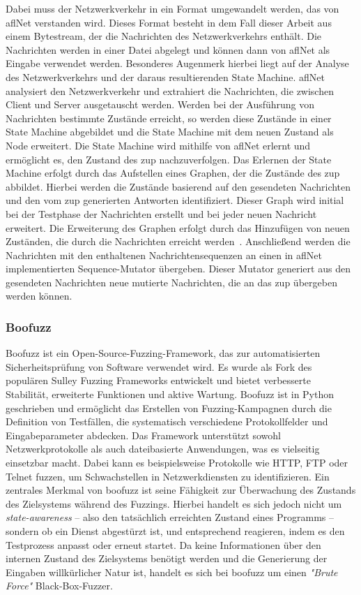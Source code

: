 Dabei muss der Netzwerkverkehr in ein Format umgewandelt werden, das von \gls{afl}Net verstanden wird.
Dieses Format besteht in dem Fall dieser Arbeit aus einem Bytestream, der die Nachrichten des Netzwerkverkehrs enthält.
Die Nachrichten werden in einer Datei abgelegt und können dann von \gls{afl}Net als Eingabe verwendet werden.
Besonderes Augenmerk hierbei liegt auf der Analyse des Netzwerkverkehrs und der daraus resultierenden State Machine.
\gls{afl}Net analysiert den Netzwerkverkehr und extrahiert die Nachrichten, die zwischen Client und Server ausgetauscht werden.
Werden bei der Ausführung von Nachrichten bestimmte Zustände erreicht, so werden diese Zustände in einer State Machine
abgebildet und die State Machine mit dem neuen Zustand als Node erweitert.
Die State Machine wird mithilfe von \gls{afl}Net erlernt und ermöglicht es, den Zustand des \gls{zup} nachzuverfolgen.
Das Erlernen der State Machine erfolgt durch das Aufstellen eines Graphen, der die Zustände des \gls{zup} abbildet.
Hierbei werden die Zustände basierend auf den gesendeten Nachrichten und den vom \gls{zup} generierten Antworten identifiziert.
Dieser Graph wird initial bei der Testphase der Nachrichten erstellt und bei jeder neuen Nachricht erweitert.
Die Erweiterung des Graphen erfolgt durch das Hinzufügen von neuen Zuständen, die durch die Nachrichten erreicht werden~\cite{AFLNet}.
\newline
Anschließend werden die Nachrichten mit den enthaltenen Nachrichtensequenzen an einen in \gls{afl}Net implementierten
Sequence-Mutator übergeben.
Dieser Mutator generiert aus den gesendeten Nachrichten neue mutierte Nachrichten, die an das \gls{zup} übergeben werden
können.
\subsubsection{Boofuzz}\label{subsubsec:boofuzz}
Boofuzz ist ein Open-Source-Fuzzing-Framework, das zur automatisierten Sicherheitsprüfung von Software verwendet wird.
Es wurde als Fork des populären Sulley Fuzzing Frameworks entwickelt und bietet verbesserte Stabilität, erweiterte Funktionen
und aktive Wartung.
Boofuzz ist in Python geschrieben und ermöglicht das Erstellen von Fuzzing-Kampagnen durch die Definition von Testfällen,
die systematisch verschiedene Protokollfelder und Eingabeparameter abdecken.
Das Framework unterstützt sowohl Netzwerkprotokolle als auch dateibasierte Anwendungen, was es vielseitig einsetzbar macht.
Dabei kann es beispielsweise Protokolle wie HTTP, FTP oder Telnet fuzzen, um Schwachstellen in Netzwerkdiensten zu identifizieren.
Ein zentrales Merkmal von boofuzz ist seine Fähigkeit zur Überwachung des Zustands des Zielsystems während des Fuzzings.
Hierbei handelt es sich jedoch nicht um \textit{state-awareness} -- also den tatsächlich erreichten Zustand eines Programms --
sondern ob ein Dienst abgestürzt ist, und entsprechend reagieren, indem es den Testprozess anpasst oder erneut startet.
Da keine Informationen über den internen Zustand des Zielsystems benötigt werden und die Generierung der Eingaben
willkürlicher Natur ist, handelt es sich bei boofuzz um einen \textit{"Brute Force"} Black-Box-Fuzzer.
